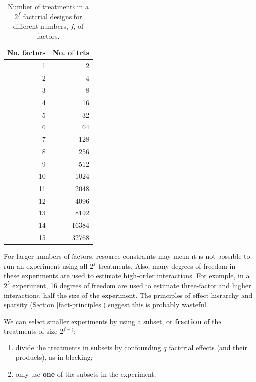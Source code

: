 \documentclass[
]{book}
\theoremstyle{definition}
\theoremstyle{definition}
\theoremstyle{definition}
\theoremstyle{definition}
\theoremstyle{remark}
\begin{document}
\begin{table}

\caption{\label{tab:size-of-factorial}Number of treatments in a $2^f$ factorial designs for different numbers, $f$, of factors.}
\centering
\begin{tabular}[t]{r|r}
\hline
No. factors & No. of trts\\
\hline
1 & 2\\
\hline
2 & 4\\
\hline
3 & 8\\
\hline
4 & 16\\
\hline
5 & 32\\
\hline
6 & 64\\
\hline
7 & 128\\
\hline
8 & 256\\
\hline
9 & 512\\
\hline
10 & 1024\\
\hline
11 & 2048\\
\hline
12 & 4096\\
\hline
13 & 8192\\
\hline
14 & 16384\\
\hline
15 & 32768\\
\hline
\end{tabular}
\end{table}

For larger numbers of factors, resource constraints may mean it is not possible to run an experiment using all \(2^f\) treatments. Also, many degrees of freedom in these experiments are used to estimate high-order interactions. For example, in a \(2^5\) experiment, 16 degrees of freedom are used to estimate three-factor and higher interactions, half the size of the experiment. The principles of effect hierarchy and sparsity (Section \ref{fact-principles}) suggest this is probably wasteful.

We can select smaller experiments by using a subset, or \textbf{fraction} of the treatments of size \(2^{f-q}\):

\begin{enumerate}
\def\labelenumi{\alph{enumi}.}
\item
  divide the treatments in subsets by confounding \(q\) factorial effects (and their products), as in blocking;
\item
  only use \textbf{one} of the subsets in the experiment.
\end{enumerate}
\end{document}
